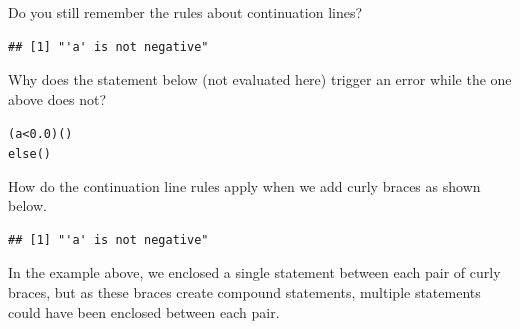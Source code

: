 \documentclass[krantz2]{krantz}\usepackage{knitr}
\begin{document}
\begin{explainbox}
Do you still remember the rules about continuation lines?

\begin{knitrout}\footnotesize
{}\color{fgcolor}\begin{kframe}
\begin{alltt}
 \hlkwb{<-} 
  \hlopt{<} \hlstd{)} \hlstd{(}\hlstd{)}  \hlstd{(}\hlstd{)}
\end{alltt}
\begin{verbatim}
## [1] "'a' is not negative"
\end{verbatim}
\end{kframe}
\end{knitrout}

Why does the statement below (not evaluated here) trigger an error while the one above does not?

\begin{knitrout}\footnotesize
{}\color{fgcolor}\begin{kframe}
\begin{alltt}
 (a < 0.0) ()
else ()
\end{alltt}
\end{kframe}
\end{knitrout}

How do the continuation line rules apply when we add curly braces as shown below.

\begin{knitrout}\footnotesize
{}\color{fgcolor}\begin{kframe}
\begin{alltt}
 \hlkwb{<-} 
  \hlopt{<} \hlstd{) \{}
    \hlstd{(}\hlstd{)}
  \hlstd{\}}  \hlstd{\{}
    \hlstd{(}\hlstd{)}
  \hlstd{\}}
\end{alltt}
\begin{verbatim}
## [1] "'a' is not negative"
\end{verbatim}
\end{kframe}
\end{knitrout}

In the example above, we enclosed a single statement between each pair of curly braces, but as these braces create compound statements, multiple statements could have been enclosed between each pair.
\end{explainbox}
\end{document}
